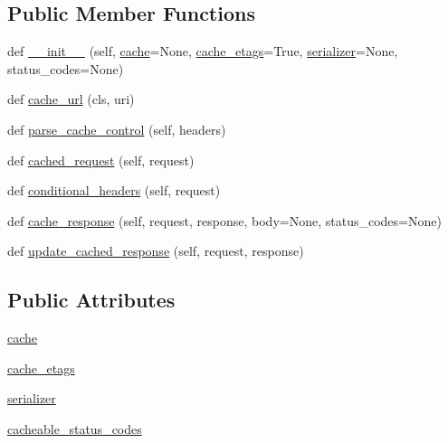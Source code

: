 \subsection*{Public Member Functions}
\begin{DoxyCompactItemize}
\item 
def \hyperlink{classpip_1_1__vendor_1_1cachecontrol_1_1controller_1_1CacheController_a23c4cfcab6fbfad760c87e3c55ef5374}{\+\_\+\+\_\+init\+\_\+\+\_\+} (self, \hyperlink{classpip_1_1__vendor_1_1cachecontrol_1_1controller_1_1CacheController_a3dbf93b9fc54cfded816c822aa5da97a}{cache}=None, \hyperlink{classpip_1_1__vendor_1_1cachecontrol_1_1controller_1_1CacheController_a0a782fbeaf69f197b84087738fce482c}{cache\+\_\+etags}=True, \hyperlink{classpip_1_1__vendor_1_1cachecontrol_1_1controller_1_1CacheController_a9899019b9ffcb403ab15e42aef0123fa}{serializer}=None, status\+\_\+codes=None)
\item 
def \hyperlink{classpip_1_1__vendor_1_1cachecontrol_1_1controller_1_1CacheController_ab7c0ebe8723b397e17679d84e8b658f9}{cache\+\_\+url} (cls, uri)
\item 
def \hyperlink{classpip_1_1__vendor_1_1cachecontrol_1_1controller_1_1CacheController_a455da23c667cf8b5d9264b95ea27b554}{parse\+\_\+cache\+\_\+control} (self, headers)
\item 
def \hyperlink{classpip_1_1__vendor_1_1cachecontrol_1_1controller_1_1CacheController_a22aecbab776b7784f79bc5ed8d3ea565}{cached\+\_\+request} (self, request)
\item 
def \hyperlink{classpip_1_1__vendor_1_1cachecontrol_1_1controller_1_1CacheController_a4d25009c223767e7eef33a2e2e5de82c}{conditional\+\_\+headers} (self, request)
\item 
def \hyperlink{classpip_1_1__vendor_1_1cachecontrol_1_1controller_1_1CacheController_a58b9d8fa67fd18cf91f78e16af87667d}{cache\+\_\+response} (self, request, response, body=None, status\+\_\+codes=None)
\item 
def \hyperlink{classpip_1_1__vendor_1_1cachecontrol_1_1controller_1_1CacheController_a88d2c9bc200beb00b49f0412ecc95757}{update\+\_\+cached\+\_\+response} (self, request, response)
\end{DoxyCompactItemize}
\subsection*{Public Attributes}
\begin{DoxyCompactItemize}
\item 
\hyperlink{classpip_1_1__vendor_1_1cachecontrol_1_1controller_1_1CacheController_a3dbf93b9fc54cfded816c822aa5da97a}{cache}
\item 
\hyperlink{classpip_1_1__vendor_1_1cachecontrol_1_1controller_1_1CacheController_a0a782fbeaf69f197b84087738fce482c}{cache\+\_\+etags}
\item 
\hyperlink{classpip_1_1__vendor_1_1cachecontrol_1_1controller_1_1CacheController_a9899019b9ffcb403ab15e42aef0123fa}{serializer}
\item 
\hyperlink{classpip_1_1__vendor_1_1cachecontrol_1_1controller_1_1CacheController_a32c74cb854aeaf097b2e469a4d03b197}{cacheable\+\_\+status\+\_\+codes}
\end{DoxyCompactItemize}


